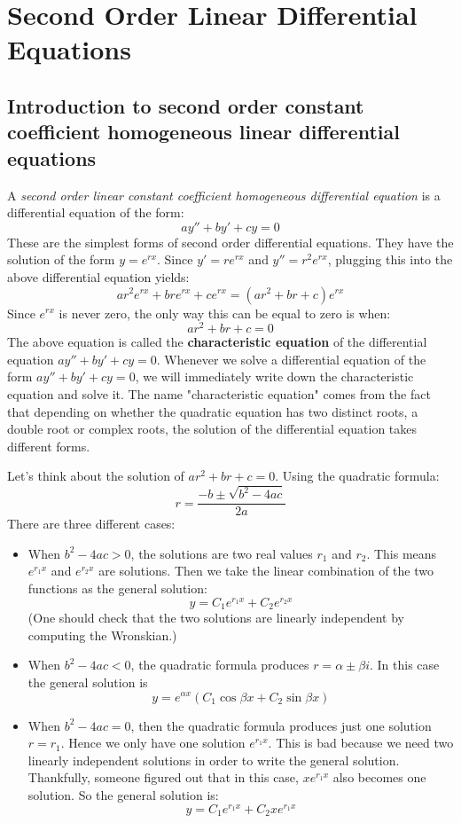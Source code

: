 \documentclass[12pt]{report}
\begin{document}
\section{Second Order Linear Differential Equations}
	\subsection*{Introduction to second order constant coefficient homogeneous linear differential equations}
A \textit{second order linear constant coefficient homogeneous differential equation} is a differential equation of the form:
$$a y''+by'+cy=0$$
These are the simplest forms of second order differential equations. They have the solution of the form $y=e^{rx}$. Since $y'=r e^{rx}$ and $y''=r^2 e^{rx}$, plugging this into the above differential equation yields:
$$a r^2 e^{rx} + b r e^{rx} + c e^{rx} = (a r^2 + br +c)e^{rx}$$
Since $e^{rx}$ is never zero, the only way this can be equal to zero is when:
$$a r^2 + br +c = 0$$
The above equation is called the \textbf{characteristic equation} of the differential equation $a y''+by'+cy=0$. Whenever we solve a differential equation of the form $a y''+by'+cy=0$, we will immediately write down the characteristic equation and solve it.
The name "characteristic equation" comes from the fact that depending on whether the quadratic equation has two distinct roots, a double root or complex roots, the solution of the differential equation takes different forms.

Let's think about the solution of $a r^2 + br +c = 0$. Using the quadratic formula:
$$r= \frac{-b \pm \sqrt{b^2-4ac}}{2a}$$
There are three different cases:
\begin{itemize}
\item  When $b^2-4ac>0$, the solutions are two real values $r_1$ and $r_2$. This means $e^{r_1 x}$ and $e^{r_2 x}$ are solutions. Then we take the linear combination of the two functions as the general solution:
	$$ y=C_1 e^{r_1 x}+ C_2 e^{r_2 x}$$
	(One should check that the two solutions are linearly independent by computing the Wronskian.)
\item  When $b^2-4ac<0$, the quadratic formula produces $r= \alpha \pm \beta i $. In this case the general solution is
$$ y=e^{\alpha x} (C_1 \cos \beta x + C_2 \sin \beta x) $$

\item  When $b^2-4ac=0$, then the quadratic formula produces just one solution $r=r_1$. Hence we only have one solution $e^{r_1 x}$. This is bad because we need two linearly independent solutions in order to write the general solution. Thankfully, someone figured out that in this case, $x e^{r_1 x}$ also becomes one solution. So the general solution is:
$$ y=C_1 e^{r_1 x}+ C_2 x e^{r_1 x}$$
\end{itemize}
\end{document}
